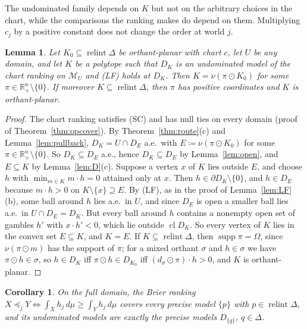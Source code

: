 \documentclass[11pt]{article}
\newcommand{\R}{\mathbb{R}}
\newcommand{\M}{\mathcal{M}}
\DeclareMathOperator{\relint}{relint}
\DeclareMathOperator{\supp}{supp}
\DeclareMathOperator{\cl}{cl}
\theoremstyle{plain}
\newtheorem{lemma}[theorem]{Lemma}
\newtheorem{corollary}[theorem]{Corollary}
\theoremstyle{definition}
\theoremstyle{remark}
\begin{document}
The undominated family depends on $K$ but not on the arbitrary choices in the chart, while
the comparisons the ranking makes do depend on them. Multiplying $c_j$ by a positive
constant does not change the order at world $j$.

\begin{lemma}\label{lem:charttarget}
Let $K_0\subseteq\relint\Delta$ be orthant-planar with chart $c$, let $U$ be any domain, and
let $K$ be a polytope such that $D_K$ is an undominated model of the chart ranking on
$\M_U$ and (LF) holds at $D_K$. Then $K=\nu(\pi\odot K_0)$ for some $\pi\in\R^n_+\setminus
\{0\}$. If moreover $K\subseteq\relint\Delta$, then $\pi$ has positive coordinates and $K$ is
orthant-planar.
\end{lemma}

\begin{proof}
The chart ranking satisfies (SC) and has null ties on every domain (proof of
Theorem~\ref{thm:opcover}). By Theorem~\ref{thm:route}(c) and Lemma~\ref{lem:pullback},
$D_K=U\cap D_E$ a.e.\ with $E\coloneqq\nu(\pi\odot K_0)$ for some $\pi\in\R^n_+\setminus
\{0\}$. So $D_K\subseteq D_E$ a.e., hence $D_K\subseteq D_E$ by Lemma~\ref{lem:open}, and
$E\subseteq K$ by Lemma~\ref{lem:D}(c). Suppose a vertex $x$ of $K$ lies outside $E$, and
choose $h$ with $\min_{m\in K}m\cdot h=0$ attained only at $x$. Then $h\in\partial D_K
\setminus\{0\}$, and $h\in D_E$ because $m\cdot h>0$ on $K\setminus\{x\}\supseteq E$. By
(LF), as in the proof of Lemma~\ref{lem:LF}(b), some ball around $h$ lies a.e.\ in $U$, and
since $D_E$ is open a smaller ball lies a.e.\ in $U\cap D_E=D_K$. But every ball around
$h$ contains a nonempty open set of gambles $h'$ with $x\cdot h'<0$, which lie outside
$\cl D_K$. So every vertex of $K$ lies in the convex set $E\subseteq K$, and $K=E$. If
$K\subseteq\relint\Delta$, then $\supp\pi=\Omega$, since $\nu(\pi\odot m)$ has the support of
$\pi$; for a mixed orthant $\sigma$ and $h\in\sigma$ we have $\pi\odot h\in\sigma$, so
$h\in D_K$ iff $\pi\odot h\in D_{K_0}$ iff $(d_\sigma\odot\pi)\cdot h>0$, and $K$ is
orthant-planar.
\end{proof}

\begin{corollary}\label{cor:precise}
On the full domain, the Brier ranking $X\preceq_jY\iff\int_Xh_j\,d\mu\ge\int_Yh_j\,d\mu$
covers every precise model $\{p\}$ with $p\in\relint\Delta$, and its undominated models
are exactly the precise models $D_{\{q\}}$, $q\in\Delta$.
\end{corollary}
\end{document}
